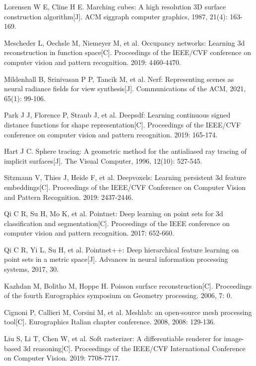 Lorensen W E, Cline H E. Marching cubes: A high resolution 3D surface construction algorithm[J]. ACM siggraph computer graphics, 1987, 21(4): 163-169.


Mescheder L, Oechsle M, Niemeyer M, et al. Occupancy networks: Learning 3d reconstruction in function space[C]. Proceedings of the IEEE/CVF conference on computer vision and pattern recognition. 2019: 4460-4470.

Mildenhall B, Srinivasan P P, Tancik M, et al. Nerf: Representing scenes as neural radiance fields for view synthesis[J]. Communications of the ACM, 2021, 65(1): 99-106.

Park J J, Florence P, Straub J, et al. Deepsdf: Learning continuous signed distance functions for shape representation[C]. Proceedings of the IEEE/CVF conference on computer vision and pattern recognition. 2019: 165-174.

Hart J C. Sphere tracing: A geometric method for the antialiased ray tracing of implicit surfaces[J]. The Visual Computer, 1996, 12(10): 527-545.

Sitzmann V, Thies J, Heide F, et al. Deepvoxels: Learning persistent 3d feature embeddings[C]. Proceedings of the IEEE/CVF Conference on Computer Vision and Pattern Recognition. 2019: 2437-2446.

Qi C R, Su H, Mo K, et al. Pointnet: Deep learning on point sets for 3d classification and segmentation[C]. Proceedings of the IEEE conference on computer vision and pattern recognition. 2017: 652-660.


Qi C R, Yi L, Su H, et al. Pointnet++: Deep hierarchical feature learning on point sets in a metric space[J]. Advances in neural information processing systems, 2017, 30.

Kazhdan M, Bolitho M, Hoppe H. Poisson surface reconstruction[C]. Proceedings of the fourth Eurographics symposium on Geometry processing. 2006, 7: 0.

Cignoni P, Callieri M, Corsini M, et al. Meshlab: an open-source mesh processing tool[C]. Eurographics Italian chapter conference. 2008, 2008: 129-136.

Liu S, Li T, Chen W, et al. Soft rasterizer: A differentiable renderer for image-based 3d reasoning[C]. Proceedings of the IEEE/CVF International Conference on Computer Vision. 2019: 7708-7717.

